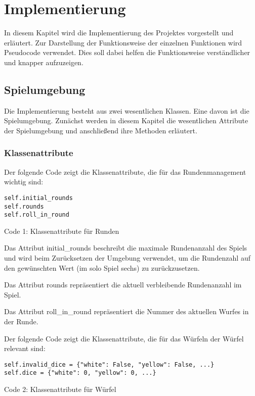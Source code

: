 \section{Implementierung}
In diesem Kapitel wird die Implementierung des Projektes vorgestellt und erläutert. Zur Darstellung der Funktionsweise der einzelnen Funktionen wird Pseudocode verwendet. Dies soll dabei helfen die Funktionsweise verständlicher und knapper aufzuzeigen.
\subsection{Spielumgebung}
Die Implementierung besteht aus zwei wesentlichen Klassen. Eine davon ist die Spielumgebung. Zunächst werden in diesem Kapitel die wesentlichen Attribute der Spielumgebung und anschließend ihre Methoden erläutert.
\subsubsection{Klassenattribute}
\begin{minipage}{\linewidth}
Der folgende Code zeigt die Klassenattribute, die für das Rundenmanagement wichtig sind:
\vspace{0.5cm}
\begin{lstlisting}
self.initial_rounds
self.rounds
self.roll_in_round
\end{lstlisting}
Code 1: Klassenattribute für Runden\\
\end{minipage}

Das Attribut initial\_rounds beschreibt die maximale Rundenanzahl des Spiels und wird beim Zurücksetzen der Umgebung verwendet, um die Rundenzahl auf den gewünschten Wert (im solo Spiel sechs) zu zurückzusetzen.

Das Attribut rounds repräsentiert die aktuell verbleibende Rundenanzahl im Spiel.

Das Attribut roll\_in\_round repräsentiert die Nummer des aktuellen Wurfes in der Runde.\\

\begin{minipage}{\linewidth}
Der folgende Code zeigt die Klassenattribute, die für das Würfeln der Würfel relevant sind:
\vspace{0.5cm}
\begin{lstlisting}
self.invalid_dice = {"white": False, "yellow": False, ...}
self.dice = {"white": 0, "yellow": 0, ...}
\end{lstlisting}
Code 2: Klassenattribute für Würfel\\
\end{minipage}

